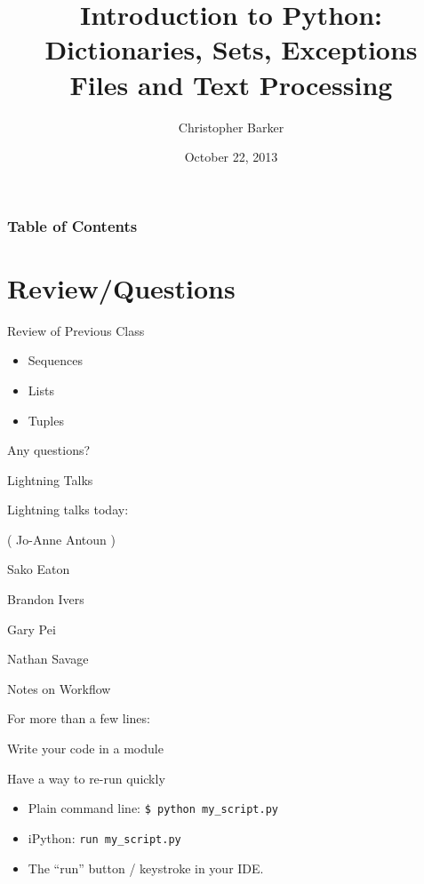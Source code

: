\documentclass{beamer}
\title[Intro to Python: Week 4]{Introduction  to Python:\\ Dictionaries, Sets, Exceptions\\ Files and Text Processing}
\author{Christopher Barker}
\institute{UW Continuing Education}
\date{October 22, 2013}
\begin{document}
\begin{frame}
  \titlepage
\end{frame}

\begin{frame}
\frametitle{Table of Contents}
  \tableofcontents
\end{frame}


\section{Review/Questions}

\begin{frame}{Review of Previous Class}

\begin{itemize}
  \item Sequences
  \item Lists
  \item Tuples
\end{itemize}

\vfill
{\Large Any questions?}

\end{frame}


\begin{frame}{Lightning Talks}

\vfill
{\LARGE Lightning talks today:}

\vfill
{\Large ( Jo-Anne Antoun )}

\vfill
{\Large
 Sako Eaton

\vfill
Brandon Ivers

\vfill
Gary Pei

\vfill
Nathan Savage

}
\vfill

\end{frame}


\begin{frame}[fragile]{Notes on Workflow}

  \vfill
  {\Large For more than a few lines:}

  \vfill
  {\large Write your code in a module}

  \vfill
  {\large Have a way to re-run quickly}
  \begin{itemize}
    \item Plain command line: \verb|$ python my_script.py|
    \item iPython: \verb|run my_script.py|
    \item The ``run'' button / keystroke in your IDE.
  \end{itemize}

  \vfill

\end{frame}
\end{document}
